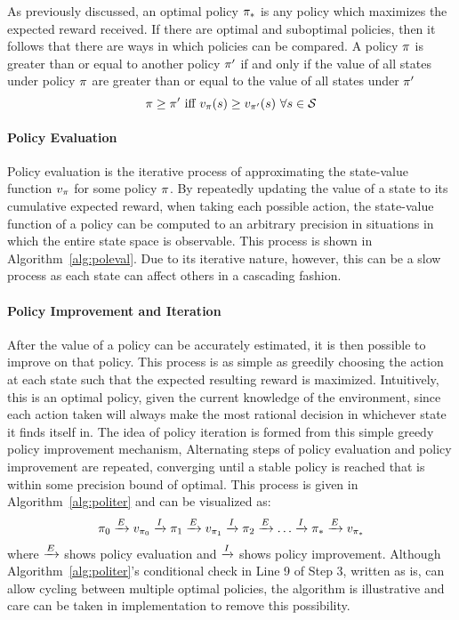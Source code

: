 As previously discussed,
an optimal policy $\pi_*$ is any policy which maximizes the expected reward
received.
%
If there are optimal and suboptimal policies,
then it follows that there are ways in which policies can be compared.
%
A policy $\pi$ is greater than or equal to another policy $\pi'$
if and only if the value of all states under policy $\pi$
are greater than or equal to the value of all states under $\pi'$
\[
\policy \ge \policy'\ 
	\text{iff}\ 
	v_\policy(s) \ge v_{\policy'}(s)\ \forall s\in\States
\]


\paragraph*{Policy Evaluation}


Policy evaluation is the iterative process of approximating the state-value
function $v_\pi$ for some policy $\pi$.
%
By repeatedly updating the value of a state
to its cumulative expected reward, when taking each possible action,
the state-value function of a policy can be computed to an
arbitrary precision
in situations in which the entire state space is observable.
%
This process is shown in Algorithm~\ref{alg:poleval}.
%
Due to its iterative nature,
however,
this can be a slow process
as each state can affect others in a cascading fashion.



\paragraph*{Policy Improvement and Iteration}



After the value of a policy can be accurately estimated,
it is then possible to improve on that policy.
% 
This process is as simple as greedily choosing the action at each state such
that the expected resulting reward is maximized.
%
Intuitively,
this is an optimal policy,
given the current knowledge of the environment,
since each action taken will always make the most rational decision
in whichever state it finds itself in.
%
The idea of policy iteration is formed
from this simple greedy policy improvement mechanism,
%
Alternating steps of policy evaluation and policy improvement are repeated,
converging
until a stable policy is reached that is within some precision bound of optimal.
%
This process is given in Algorithm~\ref{alg:politer}
and can be visualized as:
\[
	\pi_0 \xrightarrow{E} v_{\pi_0} \xrightarrow{I}
	\pi_1 \xrightarrow{E} v_{\pi_1} \xrightarrow{I}
	\pi_2 \xrightarrow{E} \ldots \xrightarrow{I}
	\pi_* \xrightarrow{E} v_{\pi_*}
\]
where $\xrightarrow{E}$ shows policy evaluation and $\xrightarrow{I}$ shows policy improvement.
%
Although Algorithm~\ref{alg:politer}'s conditional check
in Line 9 of Step 3,
written as is,
can allow cycling between multiple optimal policies,
the algorithm is illustrative
and care can be taken in implementation to remove this possibility.

